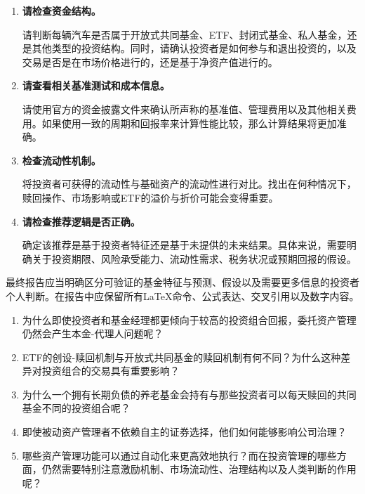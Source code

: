 \begin{enumerate}

\item \textbf{请检查资金结构。}

请判断每辆汽车是否属于开放式共同基金、ETF、封闭式基金、私人基金，还是其他类型的投资结构。同时，请确认投资者是如何参与和退出投资的，以及交易是否是在市场价格进行的，还是基于净资产值进行的。

\item \textbf{请查看相关基准测试和成本信息。}

请使用官方的资金披露文件来确认所声称的基准值、管理费用以及其他相关费用。如果使用一致的周期和回报率来计算性能比较，那么计算结果将更加准确。

\item \textbf{检查流动性机制。}

将投资者可获得的流动性与基础资产的流动性进行对比。找出在何种情况下，赎回操作、市场影响或ETF的溢价与折价可能会变得重要。

\item \textbf{请检查推荐逻辑是否正确。}

确定该推荐是基于投资者特征还是基于未提供的未来结果。具体来说，需要明确关于投资期限、风险承受能力、流动性需求、税务状况或预期回报的假设。

\end{enumerate}

最终报告应当明确区分可验证的基金特征与预测、假设以及需要更多信息的投资者个人判断。在报告中应保留所有LaTeX命令、公式表达、交叉引用以及数字内容。



\begin{enumerate}

\item 为什么即使投资者和基金经理都更倾向于较高的投资组合回报，委托资产管理仍然会产生本金-代理人问题呢？

\item ETF的创设-赎回机制与开放式共同基金的赎回机制有何不同？为什么这种差异对投资组合的交易具有重要影响？

\item 为什么一个拥有长期负债的养老基金会持有与那些投资者可以每天赎回的共同基金不同的投资组合呢？

\item 即使被动资产管理者不依赖自主的证券选择，他们如何能够影响公司治理？

\item 哪些资产管理功能可以通过自动化来更高效地执行？而在投资管理的哪些方面，仍然需要特别注意激励机制、市场流动性、治理结构以及人类判断的作用呢？

\end{enumerate}

